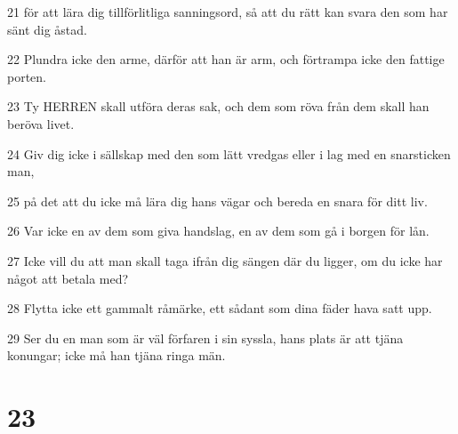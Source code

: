 \par 21 för att lära dig tillförlitliga sanningsord, så att du rätt kan svara den som har sänt dig åstad.
\par 22 Plundra icke den arme, därför att han är arm, och förtrampa icke den fattige porten.
\par 23 Ty HERREN skall utföra deras sak, och dem som röva från dem skall han beröva livet.
\par 24 Giv dig icke i sällskap med den som lätt vredgas eller i lag med en snarsticken man,
\par 25 på det att du icke må lära dig hans vägar och bereda en snara för ditt liv.
\par 26 Var icke en av dem som giva handslag, en av dem som gå i borgen för lån.
\par 27 Icke vill du att man skall taga ifrån dig sängen där du ligger, om du icke har något att betala med?
\par 28 Flytta icke ett gammalt råmärke, ett sådant som dina fäder hava satt upp.
\par 29 Ser du en man som är väl förfaren i sin syssla, hans plats är att tjäna konungar; icke må han tjäna ringa män.

\chapter{23}

